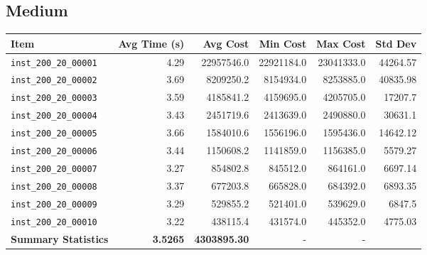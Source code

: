 \documentclass{article}
\begin{document}
\subsection*{Medium}
\begin{table}[H]
	\centering 
    \hspace*{-2cm}
	\begin{tabular}{lrrrrr} 
		\toprule 
		\textbf{Item} & \textbf{Avg Time (s)} & \textbf{Avg Cost} & \textbf{Min Cost} & \textbf{Max Cost} & \textbf{Std Dev} \\
		\midrule 
		\texttt{inst\_200\_20\_00001} & 4.29 & 22957546.0 & 22921184.0 & 23041333.0 & 44264.57 \\ \texttt{inst\_200\_20\_00002} & 3.69 & 8209250.2 & 8154934.0 & 8253885.0 & 40835.98 \\ \texttt{inst\_200\_20\_00003} & 3.59 & 4185841.2 & 4159695.0 & 4205705.0 & 17207.7 \\ \texttt{inst\_200\_20\_00004} & 3.43 & 2451719.6 & 2413639.0 & 2490880.0 & 30631.1 \\ \texttt{inst\_200\_20\_00005} & 3.66 & 1584010.6 & 1556196.0 & 1595436.0 & 14642.12 \\ \texttt{inst\_200\_20\_00006} & 3.44 & 1150608.2 & 1141859.0 & 1156385.0 & 5579.27 \\ \texttt{inst\_200\_20\_00007} & 3.27 & 854802.8 & 845512.0 & 864161.0 & 6697.14 \\ \texttt{inst\_200\_20\_00008} & 3.37 & 677203.8 & 665828.0 & 684392.0 & 6893.35 \\ \texttt{inst\_200\_20\_00009} & 3.29 & 529855.2 & 521401.0 & 539629.0 & 6847.5 \\ \texttt{inst\_200\_20\_00010} & 3.22 & 438115.4 & 431574.0 & 445352.0 & 4775.03 \\
		\midrule 
		\textbf{Summary Statistics} & \textbf{3.5265} & \textbf{4303895.30} & - & - \\ 
		\bottomrule
	\end{tabular}
	\label{tab:performance_metrics_medium_grasp}
\end{table}
\end{document}
